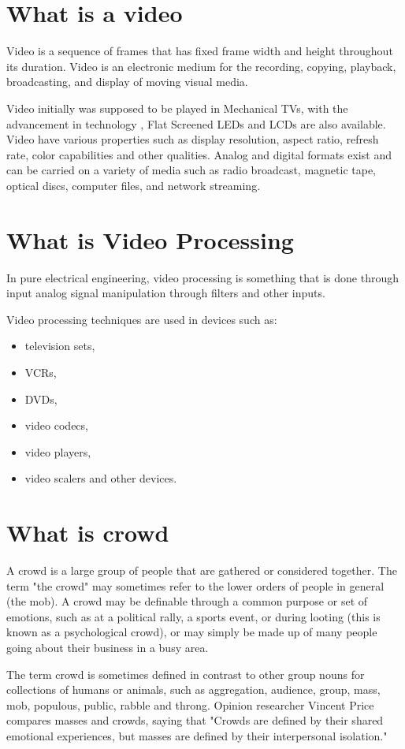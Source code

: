 \section{What is a video}
Video is a sequence of frames that has fixed frame width and height throughout its duration.
Video is an electronic medium for the recording, copying, playback,
broadcasting, and display of moving visual media.
\par
Video initially was supposed to be played in Mechanical TVs, with the advancement in technology , Flat Screened LEDs and LCDs are also available. Video have various properties such as display resolution, aspect ratio,
refresh rate, color capabilities and other qualities. Analog and digital formats exist and
can be carried on a variety of media such as radio broadcast, magnetic tape, optical
discs, computer files, and network streaming.

\section{What is Video Processing}
In pure electrical engineering, video processing is something that is done through input analog signal manipulation through filters and other inputs. \par Video processing techniques are used in devices such as:
\begin{itemize} \item television sets,
\item VCRs, \item DVDs, \item video codecs,\item video players, \item video scalers and other devices.
\end{itemize} 
\section{What is crowd}
A crowd is a large group of people that are gathered or considered together. The
term "the crowd" may sometimes refer to the lower orders of people in general (the
mob). A crowd may be definable through a common purpose or set of emotions, such as
at a political rally, a sports event, or during looting (this is known as a psychological
crowd), or may simply be made up of many people going about their business in a busy
area.\par
The term crowd is sometimes defined in contrast to other group nouns for
collections of humans or animals, such as aggregation, audience, group, mass, mob,
populous, public, rabble and throng. Opinion researcher Vincent Price compares masses
and crowds, saying that "Crowds are defined by their shared emotional experiences, but
masses are defined by their interpersonal isolation."

